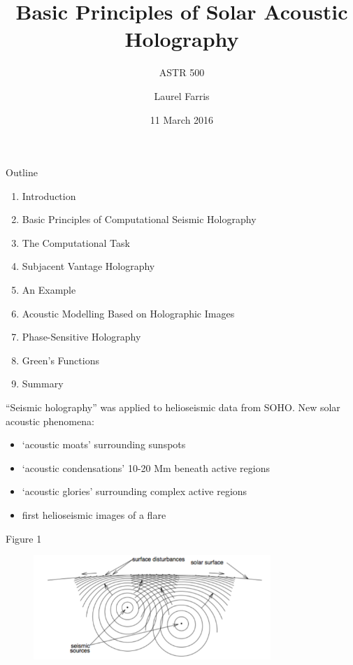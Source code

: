 \documentclass{beamer}
\title{Basic Principles of Solar Acoustic Holography}
\subtitle{ASTR 500}
\date{11 March 2016}
\author{Laurel Farris}
\begin{document}
\begin{frame}
    \titlepage
\end{frame}

\begin{frame}{Outline}
    \begin{enumerate}
        \item Introduction
        \item Basic Principles of Computational Seismic Holography
        \item The Computational Task
        \item Subjacent Vantage Holography
        \item An Example
        \item Acoustic Modelling Based on Holographic Images
        \item Phase-Sensitive Holography
        \item Green's Functions
        \item Summary
    \end{enumerate}
\end{frame}

\begin{frame}
    ``Seismic holography'' was applied to helioseismic data from SOHO\@.
    New solar acoustic phenomena:
    \begin{itemize}
        \item `acoustic moats' surrounding sunspots
        \item `acoustic condensations' 10-20 Mm beneath active regions
        \item `acoustic glories' surrounding complex active regions
        \item first helioseismic images of a flare
    \end{itemize}
\end{frame}

\begin{frame}{Figure 1}
    \begin{figure}
        \includegraphics[width=0.8\textwidth]{fig_1.pdf}
    \end{figure}
\end{frame}
\end{document}
